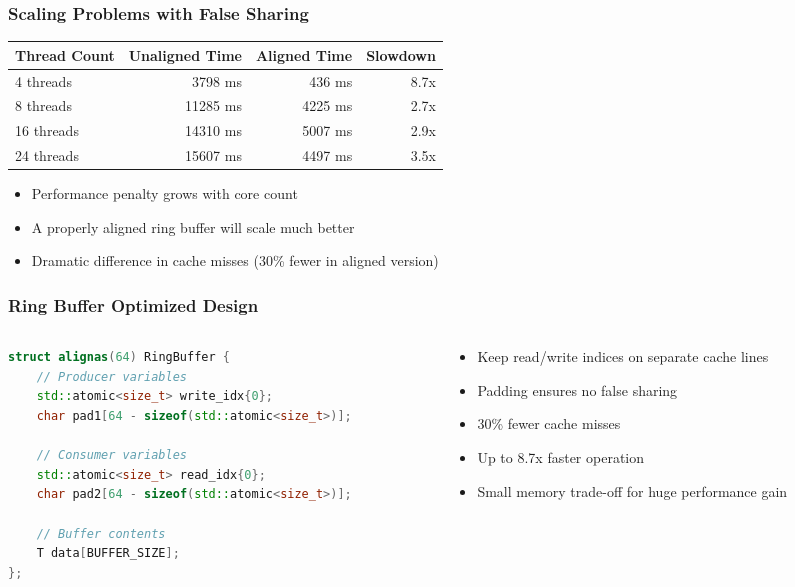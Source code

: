 \documentclass{beamer}
\begin{document}
\begin{frame}
  \frametitle{Scaling Problems with False Sharing}
  
  \begin{center}
    \begin{tabular}{|l|r|r|r|}
      \hline
      \textbf{Thread Count} & \textbf{Unaligned Time} & \textbf{Aligned Time} & \textbf{Slowdown} \\
      \hline
      4 threads & 3798 ms & 436 ms & 8.7x \\
      8 threads & 11285 ms & 4225 ms & 2.7x \\
      16 threads & 14310 ms & 5007 ms & 2.9x \\
      24 threads & 15607 ms & 4497 ms & 3.5x \\
      \hline
    \end{tabular}
  \end{center}
  
  \begin{itemize}
    \item Performance penalty grows with core count
    \item A properly aligned ring buffer will scale much better
    \item Dramatic difference in cache misses (30\% fewer in aligned version)
  \end{itemize}
\end{frame}

\begin{frame}[fragile]
  \frametitle{Ring Buffer Optimized Design}
  
  \begin{columns}
    \begin{column}{0.55\textwidth}
      \begin{lstlisting}[language=C++]
struct alignas(64) RingBuffer {
    // Producer variables
    std::atomic<size_t> write_idx{0};
    char pad1[64 - sizeof(std::atomic<size_t>)];
    
    // Consumer variables
    std::atomic<size_t> read_idx{0};
    char pad2[64 - sizeof(std::atomic<size_t>)];
    
    // Buffer contents
    T data[BUFFER_SIZE];
};
      \end{lstlisting}
    \end{column}
    
    \begin{column}{0.45\textwidth}
      \begin{itemize}
        \item Keep read/write indices on separate cache lines
        \item Padding ensures no false sharing
        \item 30\% fewer cache misses
        \item Up to 8.7x faster operation
        \item Small memory trade-off for huge performance gain
      \end{itemize}
    \end{column}
  \end{columns}
\end{frame}
\end{document}
